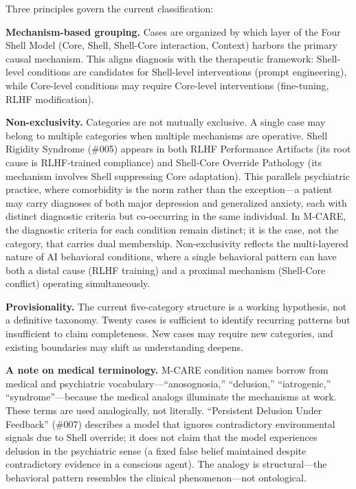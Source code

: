 \documentclass[11pt]{article}
\begin{document}
Three principles govern the current classification:

\textbf{Mechanism-based grouping.} Cases are organized by which layer of the Four Shell Model (Core, Shell, Shell-Core interaction, Context) harbors the primary causal mechanism. This aligns diagnosis with the therapeutic framework: Shell-level conditions are candidates for Shell-level interventions (prompt engineering), while Core-level conditions may require Core-level interventions (fine-tuning, RLHF modification).

\textbf{Non-exclusivity.} Categories are not mutually exclusive. A single case may belong to multiple categories when multiple mechanisms are operative. Shell Rigidity Syndrome (\#005) appears in both RLHF Performance Artifacts (its root cause is RLHF-trained compliance) and Shell-Core Override Pathology (its mechanism involves Shell suppressing Core adaptation). This parallels psychiatric practice, where comorbidity is the norm rather than the exception---a patient may carry diagnoses of both major depression and generalized anxiety, each with distinct diagnostic criteria but co-occurring in the same individual. In M-CARE, the diagnostic criteria for each condition remain distinct; it is the case, not the category, that carries dual membership. Non-exclusivity reflects the multi-layered nature of AI behavioral conditions, where a single behavioral pattern can have both a distal cause (RLHF training) and a proximal mechanism (Shell-Core conflict) operating simultaneously.

\textbf{Provisionality.} The current five-category structure is a working hypothesis, not a definitive taxonomy. Twenty cases is sufficient to identify recurring patterns but insufficient to claim completeness. New cases may require new categories, and existing boundaries may shift as understanding deepens.

\textbf{A note on medical terminology.} M-CARE condition names borrow from medical and psychiatric vocabulary---``anosognosia,'' ``delusion,'' ``iatrogenic,'' ``syndrome''---because the medical analogs illuminate the mechanisms at work. These terms are used analogically, not literally. ``Persistent Delusion Under Feedback'' (\#007) describes a model that ignores contradictory environmental signals due to Shell override; it does not claim that the model experiences delusion in the psychiatric sense (a fixed false belief maintained despite contradictory evidence in a conscious agent). The analogy is structural---the behavioral pattern resembles the clinical phenomenon---not ontological.
\end{document}
